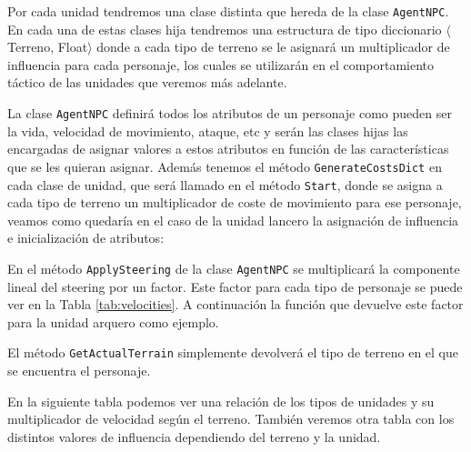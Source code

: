 Por cada unidad tendremos una clase distinta que hereda de la clase \texttt{AgentNPC}. En cada una de estas clases hija tendremos una estructura de tipo diccionario $\langle$Terreno, Float$\rangle$ donde a cada tipo de terreno se le asignará un multiplicador de influencia para cada personaje, los cuales se utilizarán en el comportamiento táctico de las unidades que veremos más adelante.

La clase \texttt{AgentNPC} definirá todos los atributos de un personaje como pueden ser la vida, velocidad de movimiento, ataque, etc y serán las clases hijas las encargadas de asignar valores a estos atributos en función de las características que se les quieran asignar. Además tenemos el método \texttt{GenerateCostsDict} en cada clase de unidad, que será llamado en el método \texttt{Start}, donde se asigna a cada tipo de terreno un multiplicador de coste de movimiento para ese personaje, veamos como quedaría en el caso de la unidad lancero la asignación de influencia e inicialización de atributos:
    

    


En el método \texttt{ApplySteering} de la clase \texttt{AgentNPC} se multiplicará la componente lineal del steering por un factor. Este factor para cada tipo de personaje se puede ver en la Tabla \ref{tab:velocities}. A continuación la función que devuelve este factor para la unidad arquero como ejemplo.



El método \texttt{GetActualTerrain} simplemente devolverá el tipo de terreno en el que se encuentra el personaje.

En la siguiente tabla podemos ver una relación de los tipos de unidades y su multiplicador de velocidad según el terreno. También veremos otra tabla con los distintos valores de influencia dependiendo del terreno y la unidad.

